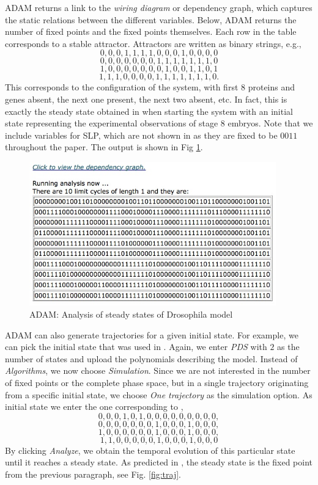 \documentclass[11pt]{amsart}
\begin{document}
 
ADAM returns a link to the {\it wiring diagram} or dependency graph, which captures the static relations between the different variables. Below, ADAM returns the number of fixed points and the fixed points themselves. Each row in the table corresponds to a stable attractor. Attractors are written as binary strings, e.g., 
$$0, 0, 0, 1, 1, 1, 1, 0, 0, 0, 1, 0, 0, 0, 0$$
$$0, 0, 0, 0, 0, 0, 0, 1, 1, 1, 1, 1, 1, 1, 0$$
$$1, 0, 0, 0, 0, 0, 0, 0, 1, 0, 0, 1, 1, 0, 1$$
$$1, 1, 1, 0, 0, 0, 0, 1, 1, 1, 1, 1, 1, 1, 0.$$
This corresponds to the configuration of the system, with first 8 proteins and genes absent, the next one present, the next two absent, etc. In fact, this is exactly the steady state obtained in \cite[Figure 4(b)]{AO} when starting the system with an initial state representing the experimental observations of stage 8 embryos. Note that we include variables for SLP, which are not shown in \cite[Figure 4(b)]{AO} as they are fixed to be $0011$ throughout the paper. The output is shown in Fig \ref{fig:alg}.
\begin{figure}[htb]
\centering
\includegraphics[width=0.95\textwidth]{DroAlgOutput.jpg}
\caption{ADAM: Analysis of steady states of Drosophila model}
\label{fig:alg}
\end{figure}
ADAM can also generate trajectories for a given initial state. For example, we
can pick the initial state that was used in \cite[Figure 4(a)]{AO}. Again, we
enter {\it PDS} with $2$ as the number of states and upload the polynomials
describing the model. Instead of {\it Algorithms}, we now choose {\it
Simulation}. Since we are not interested in the number of fixed points or the
complete phase space, but in a single trajectory originating from a specific
initial state,  we choose {\it One trajectory} as the simulation option. As
initial state we enter the one corresponding to \cite[Figure 4(a)]{AO},
$$0, 0, 0, 1, 0, 1, 0, 0, 0, 0, 0, 0, 0, 0, 0,$$
$$0, 0, 0, 0, 0, 0, 0, 1, 0, 0, 0, 1, 0, 0, 0,$$
$$1, 0, 0, 0, 0, 0, 0, 1, 0, 0, 0, 1, 0, 0, 0,$$
$$1, 1, 0, 0, 0, 0, 0, 1, 0, 0, 0, 1, 0, 0, 0$$
By clicking {\it Analyze}, we obtain the temporal evolution of this particular
state until it reaches a steady state. As predicted in \cite{AO}, the
steady state is the fixed point from the previous paragraph, see Fig.
\ref{fig:traj}.
 
\end{document}

